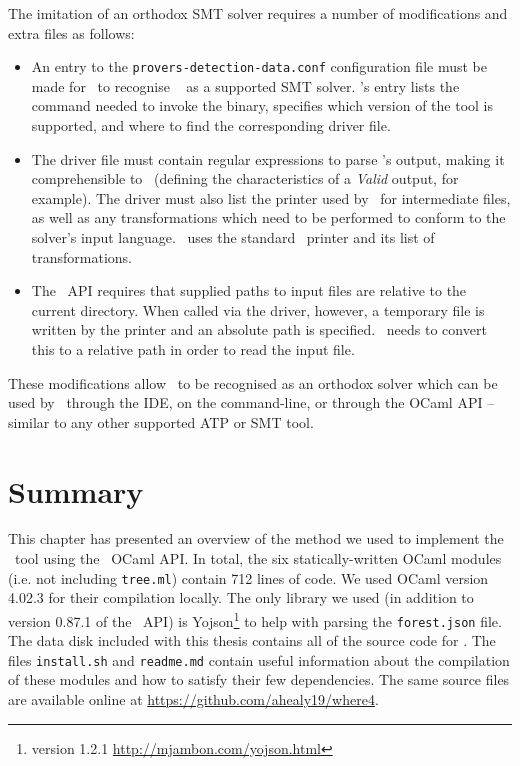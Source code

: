 The imitation of an orthodox SMT solver requires a number of modifications and extra files as follows:
\begin{itemize}
	\item An entry to the \texttt{provers-detection-data.conf} configuration file must be made for \why~to recognise \where~ as a supported SMT solver.
	\where's entry lists the command needed to invoke the binary, specifies which version of the tool is supported, and where to find the corresponding driver file.
	\item The driver file must contain regular expressions to parse \where's output, making it comprehensible to \why~(defining the characteristics of a \textit{Valid} output, for example). 
	The driver must also list the printer used by \why~for intermediate files, as well as any transformations which need to be performed to conform to the solver's input language. \where~uses the standard \why~printer and its list of transformations.
	\item The \why~API requires that supplied paths to input files are relative to the current directory. When called via the driver, however, a temporary file is written by the printer and an absolute path is specified. \where~needs to convert this to a relative path in order to read the input file.     
\end{itemize}

These modifications allow \where~to be recognised as an orthodox solver which can be used by \why~through the IDE, on the command-line, or through the OCaml API -- similar to any other supported ATP or SMT tool. 

\section{Summary}

This chapter has presented an overview of the method we used to implement the \where~tool using the \why~OCaml API.
In total, the six statically-written OCaml modules (i.e. not including \texttt{tree.ml}) contain 712 lines of code.
We used OCaml version 4.02.3 for their compilation locally.
The only library we used (in addition to version 0.87.1 of the \why~API) is Yojson\footnote{version 1.2.1 \url{http://mjambon.com/yojson.html}}  to help with parsing the \texttt{forest.json} file. 
The data disk included with this thesis contains all of the source code for \where. 
The files \texttt{install.sh} and \texttt{readme.md} contain useful information about the compilation of these modules and how to satisfy their few dependencies.
The same source files are available online at \url{https://github.com/ahealy19/where4}.

